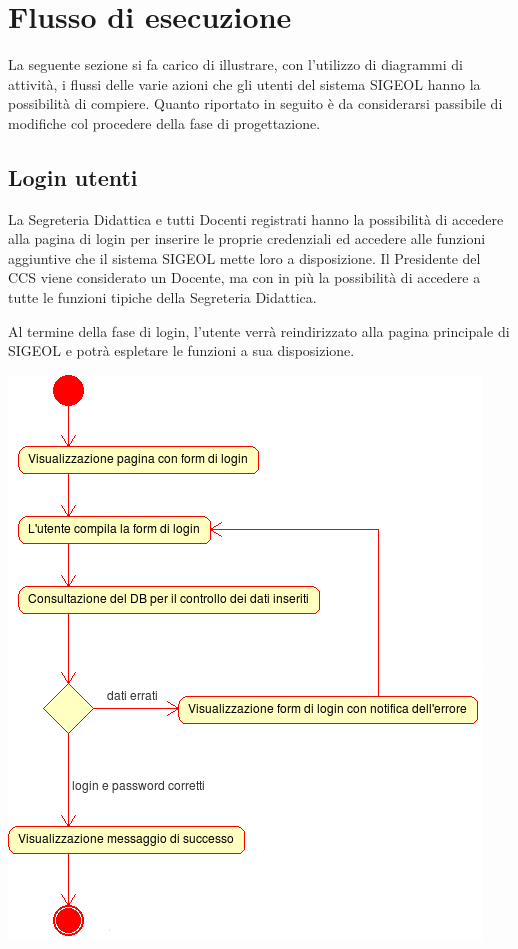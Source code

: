\documentclass[11pt,a4paper]{article}
\begin{document}
\section{Flusso di esecuzione}
La seguente sezione si fa carico di illustrare, con l'utilizzo di diagrammi di attività, i flussi delle varie azioni che gli utenti del sistema SIGEOL hanno la possibilità di compiere.
Quanto riportato in seguito è da considerarsi passibile di modifiche col procedere della fase di progettazione.
\newpage
\subsection{Login utenti}
La Segreteria Didattica e tutti Docenti registrati hanno la possibilità di accedere alla pagina di login per inserire le proprie credenziali ed accedere alle funzioni aggiuntive che il sistema SIGEOL mette loro a disposizione. Il Presidente del CCS viene considerato un Docente, ma con in più la possibilità di accedere a tutte le funzioni tipiche della Segreteria Didattica.

Al termine della fase di login, l'utente verrà reindirizzato alla pagina principale di SIGEOL e potrà espletare le funzioni a sua disposizione.\\
\begin{center}
 \includegraphics[scale=1]{images/login.png}
\end{center}
\end{document}
